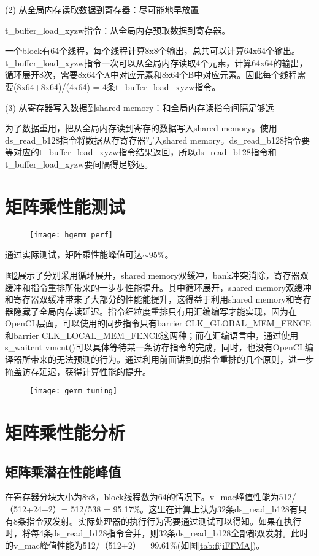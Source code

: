 (2) 从全局内存读取数据到寄存器：尽可能地早放置

t\_buffer\_load\_xyzw指令：从全局内存预取数据到寄存器。

一个block有64个线程，每个线程计算8x8个输出，总共可以计算64x64个输出。t\_buffer\_load\_xyzw指令一次可以从全局内存读取4个元素，计算64x64的输出，循环展开8次，需要8x64个A中对应元素和8x64个B中对应元素。因此每个线程需要(8x64+8x64)/(4x64) = 4条t\_buffer\_load\_xyzw指令。

(3) 从寄存器写入数据到shared memory：和全局内存读指令间隔足够远

为了数据重用，把从全局内存读到寄存的数据写入shared memory。使用ds\_read\_b128指令将数据从存寄存器写入shared memory。ds\_read\_b128指令要等对应的t\_buffer\_load\_xyzw指令结果返回，所以ds\_read\_b128指令和t\_buffer\_load\_xyzw要间隔得足够远。

\section{矩阵乘性能测试}
\begin{figure}[htbp]
	\centering
	\texttt{[image: hgemm\_perf]}
	\label{fig:hgemm_perf}
\end{figure}

通过实际测试，矩阵乘性能峰值可达$\sim$95\%。

图\ref{fig:gemm_tuning}展示了分别采用循环展开，shared memory双缓冲，bank冲突消除，寄存器双缓冲和指令重排所带来的一步步性能提升。其中循环展开，shared memory双缓冲和寄存器双缓冲带来了大部分的性能能提升，这得益于利用shared memory和寄存器隐藏了全局内存读延迟。指令细粒度重排只有用汇编编写才能实现，因为在OpenCL层面，可以使用的同步指令只有barrier CLK\_GLOBAL\_MEM\_FENCE和barrier CLK\_LOCAL\_MEM\_FENCE这两种；而在汇编语言中，通过使用s\_waitcnt vmcnt()可以具体等待某一条访存指令的完成，同时，也没有OpenCL编译器所带来的无法预测的行为。通过利用前面讲到的指令重排的几个原则，进一步掩盖访存延迟，获得计算性能的提升。
\begin{figure}[htbp]
	\centering
	\texttt{[image: gemm\_tuning]}
	\label{fig:gemm_tuning}
\end{figure}

\section{矩阵乘性能分析}
\subsection{矩阵乘潜在性能峰值}
在寄存器分块大小为8x8，block线程数为64的情况下。v\_mac峰值性能为512/（512+24+2）= 512/538 = 95.17\%。这里在计算上认为32条ds\_read\_b128有只有8条指令双发射。实际处理器的执行行为需要通过测试可以得知。如果在执行时，将每4条ds\_read\_b128指令合并，则32条ds\_read\_b128全部都双发射。此时的v\_mac峰值性能为512/（512+2）= 99.61\%(如图\ref{tab:fijiFFMA})。

